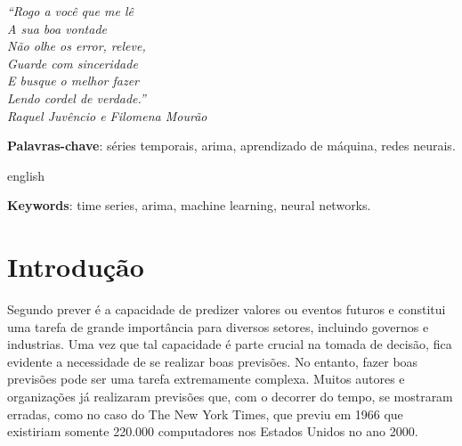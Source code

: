 \documentclass[
    12pt,
    oneside,
    a4paper,
    english,
    brazil
]{abntex2}
\begin{document}
\frenchspacing

\imprimircapa{}

\imprimirfolhaderosto{}

\begin{epigrafe}
    \vspace*{\fill}
	\begin{flushright}
		\textit{``Rogo a você que me lê\\
        A sua boa vontade\\
        Não olhe os error, releve,\\
        Guarde com sinceridade\\
        E busque o melhor fazer\\
        Lendo cordel de verdade.''\\
        Raquel Juvêncio e Filomena Mourão}
	\end{flushright}
\end{epigrafe}

\begin{resumo}

    \textbf{Palavras-chave}: séries temporais, arima, aprendizado de máquina,
    redes neurais.
\end{resumo}

\begin{resumo}[Abstract]
    \begin{otherlanguage*}{english}

        \textbf{Keywords}: time series, arima, machine learning, neural
        networks.
    \end{otherlanguage*}
\end{resumo}

\textual{}

\tableofcontents*
\cleardoublepage{}

\chapter{Introdução}


Segundo  prever é a capacidade de predizer valores ou eventos
futuros e  constitui uma  tarefa de grande  importância para  diversos setores,
incluindo governos e industrias. Uma vez  que tal capacidade é parte crucial na
tomada de decisão,  fica evidente a necessidade de se  realizar boas previsões.
No entanto,  fazer boas  previsões pode ser  uma tarefa  extremamente complexa.
Muitos autores  e organizações já realizaram  previsões que, com o  decorrer do
tempo, se mostraram erradas, como no caso  do The New York Times, que previu em
1966  que existiriam  somente 220.000  computadores nos  Estados Unidos  no ano
2000.
\end{document}
